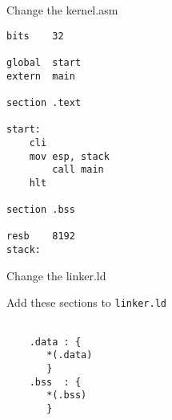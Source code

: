 \documentclass[aspectratio=169,12pt,handout]{beamer}
\begin{document}
\begin{frame}[fragile]{Change the kernel.asm}

  \begin{lstlisting}
bits 	32			
	
global	start	
extern	main
	
section .text	
	
start:
	cli
	mov esp, stack
        call main
	hlt
	
section .bss
	
resb 	8192
stack:		
  \end{lstlisting}
\end{frame}

\begin{frame}[fragile]{Change the linker.ld}

  Add these sections to {\tt linker.ld}
  
  \begin{lstlisting}

    .data : {
       *(.data)
       }
    .bss  : {
       *(.bss)
       }

  \end{lstlisting}
\end{frame}
\end{document}
